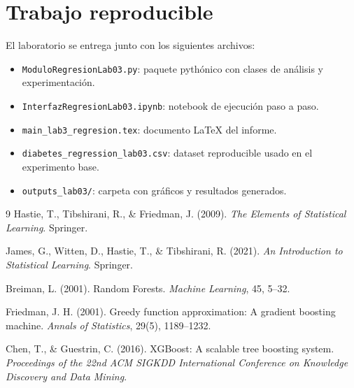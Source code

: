 \documentclass[12pt,letterpaper]{article}
\begin{document}
\section{Trabajo reproducible}
El laboratorio se entrega junto con los siguientes archivos:
\begin{itemize}
    \item \texttt{ModuloRegresionLab03.py}: paquete pythónico con clases de análisis y experimentación.
    \item \texttt{InterfazRegresionLab03.ipynb}: notebook de ejecución paso a paso.
    \item \texttt{main\_lab3\_regresion.tex}: documento LaTeX del informe.
    \item \texttt{diabetes\_regression\_lab03.csv}: dataset reproducible usado en el experimento base.
    \item \texttt{outputs\_lab03/}: carpeta con gráficos y resultados generados.
\end{itemize}

\begin{thebibliography}{9}
Hastie, T., Tibshirani, R., \& Friedman, J. (2009). \textit{The Elements of Statistical Learning}. Springer.

James, G., Witten, D., Hastie, T., \& Tibshirani, R. (2021). \textit{An Introduction to Statistical Learning}. Springer.

Breiman, L. (2001). Random Forests. \textit{Machine Learning}, 45, 5--32.

Friedman, J. H. (2001). Greedy function approximation: A gradient boosting machine. \textit{Annals of Statistics}, 29(5), 1189--1232.

Chen, T., \& Guestrin, C. (2016). XGBoost: A scalable tree boosting system. \textit{Proceedings of the 22nd ACM SIGKDD International Conference on Knowledge Discovery and Data Mining}.
\end{thebibliography}
\end{document}
